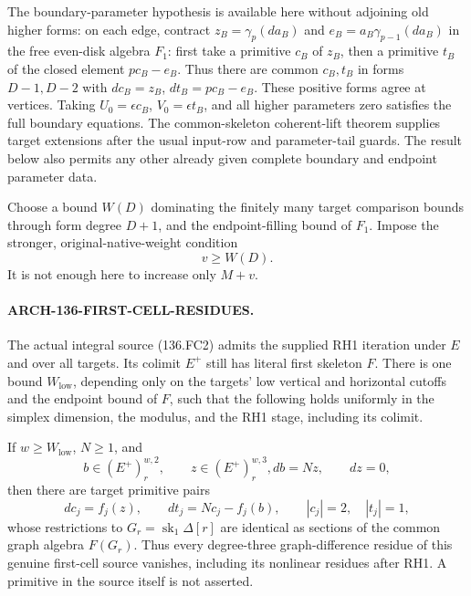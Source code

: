 The boundary-parameter hypothesis is available here without
adjoining old higher forms: on each edge, contract
\(z_B=\gamma_p(da_B)\) and
\(e_B=a_B\gamma_{p-1}(da_B)\) in the free even-disk
algebra \(F_1\): first take a primitive \(c_B\) of
\(z_B\), then a primitive \(t_B\) of the closed element
\(pc_B-e_B\). Thus there are common \(c_B,t_B\) in forms
\(D-1,D-2\) with \(dc_B=z_B\), \(dt_B=pc_B-e_B\).
These positive forms agree at vertices. Taking
\(U_0=\epsilon c_B\), \(V_0=\epsilon t_B\), and all
higher parameters zero satisfies the full boundary equations.
The common-skeleton coherent-lift theorem supplies target
extensions after the usual input-row and parameter-tail guards.
The result below also permits any other already given complete
boundary and endpoint parameter data.

Choose a bound \(W(D)\) dominating the finitely many target
comparison bounds through form degree \(D+1\), and the
endpoint-filling bound of \(F_1\). Impose the stronger,
original-native-weight condition
\[
                              v\geq W(D).                \tag{136.FC3}
\]
It is not enough here to increase only \(M+v\).

\paragraph{ARCH-136-FIRST-CELL-RESIDUES.}
The actual integral source (136.FC2) admits the supplied RH1
iteration under \(E\) and over all targets. Its colimit \(E^+\)
still has literal first skeleton \(F\). There is one bound
\(W_{\mathrm{low}}\), depending only on the targets' low
vertical and horizontal cutoffs and the endpoint bound of \(F\),
such that the following holds uniformly in the simplex dimension,
the modulus, and the RH1 stage, including its colimit.

If \(w\geq W_{\mathrm{low}}\), \(N\geq1\), and
\[
 b\in(E^+)_r^{w,2},\qquad z\in(E^+)_r^{w,3},
                         db=Nz,\qquad dz=0,              \tag{136.FC4}
\]
then there are target primitive pairs
\[
 dc_j=f_j(z),\qquad dt_j=Nc_j-f_j(b),
                  \qquad |c_j|=2,\quad |t_j|=1,          \tag{136.FC5}
\]
whose restrictions to \(G_r=\operatorname{sk}_1\Delta[r]\)
are identical as sections of the common graph algebra \(F(G_r)\).
Thus every degree-three graph-difference residue of this genuine
first-cell source vanishes, including its nonlinear residues after
RH1. A primitive in the source itself is not asserted.

